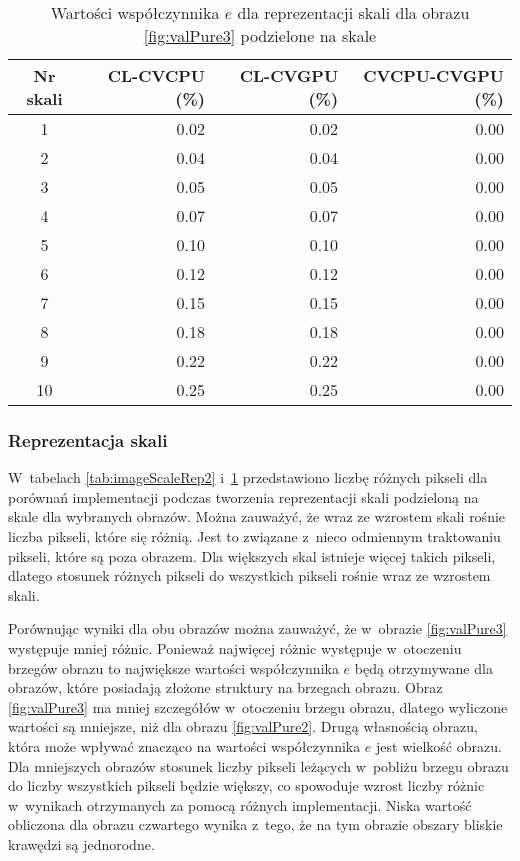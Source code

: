 \begin{center}
\begin{table}
\centering
\caption{Wartości współczynnika $ e $ dla reprezentacji skali dla obrazu \ref{fig:valPure3} podzielone na skale}
\label{tab:imageScaleRep3}
\begin{tabular}{|c|r|r|r|}
 \hline
Nr skali & CL-CVCPU (\%) & CL-CVGPU (\%) & CVCPU-CVGPU (\%) \\ \hline
1        & 0.02     & 0.02     & 0.00        \\ \hline
2        & 0.04     & 0.04     & 0.00        \\ \hline
3        & 0.05     & 0.05     & 0.00        \\ \hline
4        & 0.07     & 0.07     & 0.00        \\ \hline
5        & 0.10     & 0.10     & 0.00        \\ \hline
6        & 0.12     & 0.12     & 0.00        \\ \hline
7        & 0.15     & 0.15     & 0.00        \\ \hline
8        & 0.18     & 0.18     & 0.00        \\ \hline
9        & 0.22     & 0.22     & 0.00        \\ \hline
10       & 0.25     & 0.25     & 0.00        \\ \hline
\end{tabular}
\end{table}
\end{center}

\subsubsection{Reprezentacja skali}
\label{subsubsec:reprezentacjaSakliTabele}

W~tabelach \ref{tab:imageScaleRep2} i~\ref{tab:imageScaleRep3} przedstawiono liczbę różnych pikseli dla porównań implementacji podczas tworzenia reprezentacji skali podzieloną na skale dla wybranych obrazów. Można zauważyć, że wraz ze wzrostem skali rośnie liczba pikseli, które się różnią. Jest to związane z~nieco odmiennym traktowaniu pikseli, które są poza obrazem. Dla większych skal istnieje więcej takich pikseli, dlatego stosunek różnych pikseli do wszystkich pikseli rośnie wraz ze wzrostem skali.

Porównując wyniki dla obu obrazów można zauważyć, że w~obrazie \ref{fig:valPure3} występuje mniej różnic. Ponieważ najwięcej różnic występuje w~otoczeniu brzegów obrazu to największe wartości współczynnika $ e $ będą otrzymywane dla obrazów, które posiadają złożone struktury na brzegach obrazu. Obraz \ref{fig:valPure3} ma mniej szczegółów w~otoczeniu brzegu obrazu, dlatego wyliczone wartości są mniejsze, niż dla obrazu \ref{fig:valPure2}. Drugą własnością obrazu, która może wpływać znacząco na wartości współczynnika $ e $ jest wielkość obrazu. Dla mniejszych obrazów stosunek liczby pikseli leżących w~pobliżu brzegu obrazu do liczby wszystkich pikseli będzie większy, co spowoduje wzrost liczby różnic w~wynikach otrzymanych za pomocą różnych implementacji. Niska wartość obliczona dla obrazu czwartego wynika z~tego, że na tym obrazie obszary bliskie krawędzi są jednorodne.

